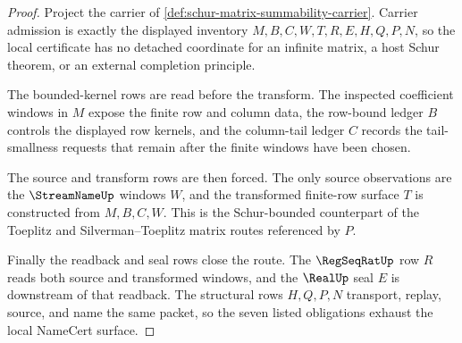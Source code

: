 \begin{proof}
Project the carrier of \autoref{def:schur-matrix-summability-carrier}. Carrier admission is exactly the displayed inventory $M,B,C,W,T,R,E,H,Q,P,N$, so the local certificate has no detached coordinate for an infinite matrix, a host Schur theorem, or an external completion principle.

The bounded-kernel rows are read before the transform. The inspected coefficient windows in $M$ expose the finite row and column data, the row-bound ledger $B$ controls the displayed row kernels, and the column-tail ledger $C$ records the tail-smallness requests that remain after the finite windows have been chosen.

The source and transform rows are then forced. The only source observations are the $\StreamNameUp$ windows $W$, and the transformed finite-row surface $T$ is constructed from $M,B,C,W$. This is the Schur-bounded counterpart of the Toeplitz and Silverman--Toeplitz matrix routes referenced by $P$.

Finally the readback and seal rows close the route. The $\RegSeqRatUp$ row $R$ reads both source and transformed windows, and the $\RealUp$ seal $E$ is downstream of that readback. The structural rows $H,Q,P,N$ transport, replay, source, and name the same packet, so the seven listed obligations exhaust the local NameCert surface.
\end{proof}


\begin{closurestatus}{\SchurMatrixSummabilityUp}
  \theoryclosure{\seedClosure}
  \formalstatus{\unformalizedV}
\end{closurestatus}

